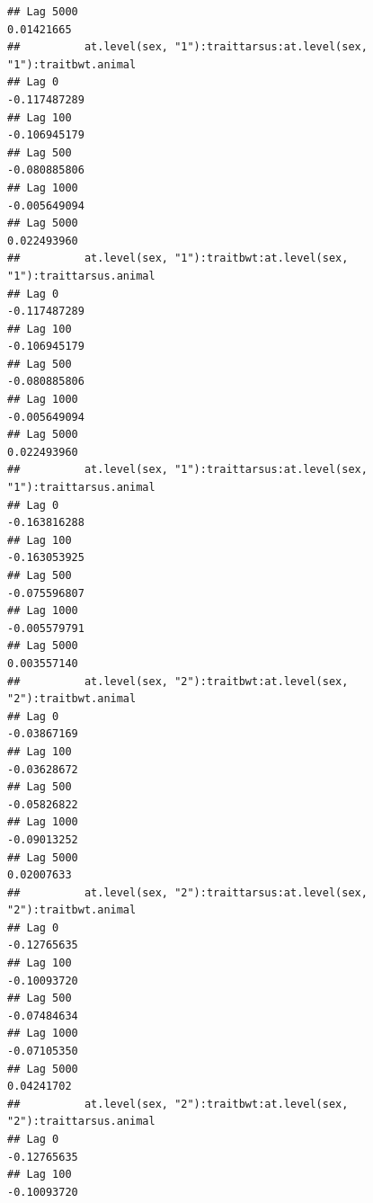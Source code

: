 \documentclass[
  12pt,
]{book}
\begin{document}
\begin{verbatim}
## Lag 5000                                                     0.01421665
##          at.level(sex, "1"):traittarsus:at.level(sex, "1"):traitbwt.animal
## Lag 0                                                         -0.117487289
## Lag 100                                                       -0.106945179
## Lag 500                                                       -0.080885806
## Lag 1000                                                      -0.005649094
## Lag 5000                                                       0.022493960
##          at.level(sex, "1"):traitbwt:at.level(sex, "1"):traittarsus.animal
## Lag 0                                                         -0.117487289
## Lag 100                                                       -0.106945179
## Lag 500                                                       -0.080885806
## Lag 1000                                                      -0.005649094
## Lag 5000                                                       0.022493960
##          at.level(sex, "1"):traittarsus:at.level(sex, "1"):traittarsus.animal
## Lag 0                                                            -0.163816288
## Lag 100                                                          -0.163053925
## Lag 500                                                          -0.075596807
## Lag 1000                                                         -0.005579791
## Lag 5000                                                          0.003557140
##          at.level(sex, "2"):traitbwt:at.level(sex, "2"):traitbwt.animal
## Lag 0                                                       -0.03867169
## Lag 100                                                     -0.03628672
## Lag 500                                                     -0.05826822
## Lag 1000                                                    -0.09013252
## Lag 5000                                                     0.02007633
##          at.level(sex, "2"):traittarsus:at.level(sex, "2"):traitbwt.animal
## Lag 0                                                          -0.12765635
## Lag 100                                                        -0.10093720
## Lag 500                                                        -0.07484634
## Lag 1000                                                       -0.07105350
## Lag 5000                                                        0.04241702
##          at.level(sex, "2"):traitbwt:at.level(sex, "2"):traittarsus.animal
## Lag 0                                                          -0.12765635
## Lag 100                                                        -0.10093720

\end{verbatim}
\end{document}
